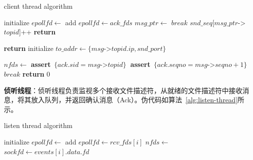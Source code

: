 {\begin{enumerate}[label=\arabic*.]
              \begin{algorithm}[H]
                  \caption{client thread algorithm}\label{alg:client-thread}
                  \begin{algorithmic}[1] %
                      \State initialize $epollfd \gets$ 
                      \State add $epollfd \gets ack\_fds$
                      \State {}
                      \State $msg\_ptr \gets$ 
                      \State $break$
                      \EndIf
                      \EndFor
                      \State $snd\_seq[msg\_ptr$->$topid]$++
                      \State {}
                      \EndWhile
                      \State \textbf{return}
                      \EndProcedure

                      \State \textbf{return} 
                      \Else
                      \State initialize $to\_addr \gets \{msg$->$topid.ip,snd\_port \}$
                      \State {}
                      \EndIf

                      \State $nfds \gets$ 
                      \State {}
                      \State \textbf{assert}~$\{ack.sid = msg$->$topid\}\;$
                      \State \textbf{assert}~$\{ack.seqno = msg$->$seqno+1\}\;$
                      \State $break$
                      \EndWhile
                      \State \textbf{return} $0$
                      \EndFunction
                  \end{algorithmic}
              \end{algorithm}

              \textbf{侦听线程}：侦听线程负责监视多个接收文件描述符，从就绪的文件描述符中接收消息，将其放入队列，并返回确认消息（Ack）。伪代码如算法~\ref{alg:listen-thread}所示。
              \begin{algorithm}[H]
                  \caption{listen thread algorithm}\label{alg:listen-thread}
                  \begin{algorithmic}[1] %
                      \State initialize $epollfd \gets$ 
                      \State add $epollfd \gets rcv\_fds[i]$
                      \EndFor
                      \State $nfds \gets$ 
                      \State $sockfd \gets events[i].data.fd$
                      \State {}


\end{algorithmic}
\end{algorithm}
\end{enumerate}}
